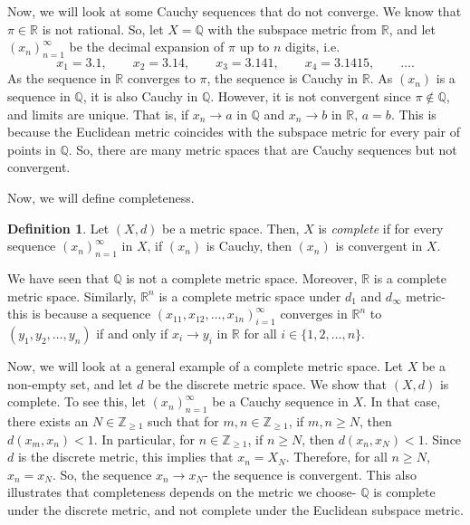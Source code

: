 \documentclass[a4paper, openany]{memoir}
\theoremstyle{definition}
\newtheorem{definition}{Definition}[section]
\theoremstyle{plain}
\begin{document}
Now, we will look at some Cauchy sequences that do not converge. We know that $\pi \in \mathbb{R}$ is not rational. So, let $X = \mathbb{Q}$ with the subspace metric from $\mathbb{R}$, and let $(x_n)_{n=1}^{\infty}$ be the decimal expansion of $\pi$ up to $n$ digits, i.e.
\[x_1 = 3.1, \qquad x_2 = 3.14, \qquad x_3 = 3.141, \qquad x_4 = 3.1415, \qquad \dots.\]
As the sequence in $\mathbb{R}$ converges to $\pi$, the sequence is Cauchy in $\mathbb{R}$. As $(x_n)$ is a sequence in $\mathbb{Q}$, it is also Cauchy in $\mathbb{Q}$. However, it is not convergent since $\pi \not\in \mathbb{Q}$, and limits are unique. That is, if $x_n \to a$ in $\mathbb{Q}$ and $x_n \to b$ in $\mathbb{R}$, $a = b$. This is because the Euclidean metric coincides with the subspace metric for every pair of points in $\mathbb{Q}$. So, there are many metric spaces that are Cauchy sequences but not convergent. 

Now, we will define completeness.
\begin{definition}
Let $(X, d)$ be a metric space. Then, $X$ is \emph{complete} if for every sequence $(x_n)_{n=1}^{\infty}$ in $X$, if $(x_n)$ is Cauchy, then $(x_n)$ is convergent in $X$.
\end{definition}
\noindent We have seen that $\mathbb{Q}$ is not a complete metric space. Moreover, $\mathbb{R}$ is a complete metric space. Similarly, $\mathbb{R}^n$ is a complete metric space under $d_1$ and $d_\infty$ metric- this is because a sequence $(x_{11}, x_{12}, \dots, x_{1n})_{i=1}^{\infty}$ converges in $\mathbb{R}^n$ to $(y_1, y_2, \dots, y_n)$ if and only if $x_i \to y_i$ in $\mathbb{R}$ for all $i \in \{1, 2, \dots, n\}$. 

Now, we will look at a general example of a complete metric space. Let $X$ be a non-empty set, and let $d$ be the discrete metric space. We show that $(X, d)$ is complete. To see this, let $(x_n)_{n=1}^{\infty}$ be a Cauchy sequence in $X$. In that case, there exists an $N \in \mathbb{Z}_{\geqslant 1}$ such that for $m, n \in \mathbb{Z}_{\geqslant 1}$, if $m, n \geqslant N$, then $d(x_m, x_n) < 1$. In particular, for $n \in \mathbb{Z}_{\geqslant 1}$, if $n \geqslant N$, then $d(x_n, x_N) < 1$. Since $d$ is the discrete metric, this implies that $x_n = X_N$. Therefore, for all $n \geqslant N$, $x_n = x_N$. So, the sequence $x_n \to x_N$- the sequence is convergent. This also illustrates that completeness depends on the metric we choose- $\mathbb{Q}$ is complete under the discrete metric, and not complete under the Euclidean subspace metric.
\end{document}
